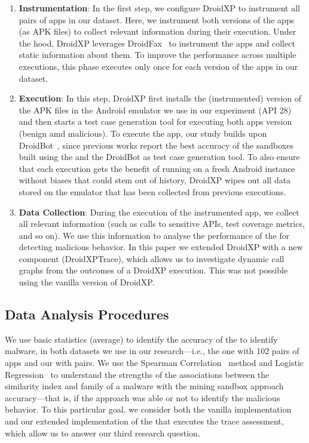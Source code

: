 \begin{enumerate}[S1]
 \item \textbf{Instrumentation}: In the first step,
we configure DroidXP to instrument all pairs of apps in our dataset.
Here, we instrument both versions of the apps (as APK files) to collect relevant information during their execution. Under the hood, DroidXP leverages
DroidFax~\cite{DBLP:conf/icsm/CaiR17a} to instrument the apps and collect static
information about them. To improve the performance across multiple executions,
this phase executes only once for each version of the apps in our dataset.

\item \textbf{Execution}: In this step, DroidXP first installs the (instrumented) version of the APK files in the Android emulator we use in our experiment (API 28) and then starts a test case generation tool for executing both apps version (benign amd malicious). To execute the app, our study builds upon DroidBot~\cite{DBLP:conf/icse/LiYGC17}, since previous works report the best accuracy of the sandboxes built using the \mas and the DroidBot as test case generation tool. To also ensure that each execution gets the benefit of running on a fresh Android instance without biases that could stem out of history, DroidXP wipes out all data stored on the emulator that has been collected from previous executions.


\item \textbf{Data Collection}: During the execution of the instrumented app, we collect all relevant information (such as calls to sensitive APIs, test coverage metrics, and so on). We use this information to analyse the performance of the \mas for detecting malicious behavior. In this paper we extended DroidXP with a new component (DroidXPTrace), which allows us to investigate dynamic call graphs from the outcomes of a DroidXP execution. This was not possible using the vanilla version of DroidXP.
\end{enumerate}

\subsection{Data Analysis Procedures} \label{sec:dataAnalysisProc}

We use basic statistics (average) to identify the
accuracy of the \mas to identify malware, in both
datasets we use in our research---i.e., the \sds
one with 102 pairs of apps and our \cds with
\apps pairs. We use the Spearman Correlation~\cite{spearman-correlation} method and
Logistic Regression~\cite{statistical-learning} to understand the strengths of
the associations between the similarity index and family of a
malware with the mining sandbox approach accuracy---that is,
if the approach was able or not to identify the malicious behavior.
To this particular goal, we consider
both the vanilla implementation and our extended implementation
of the \mas that executes the trace assessment, which allow us
to answer our third research question. 


